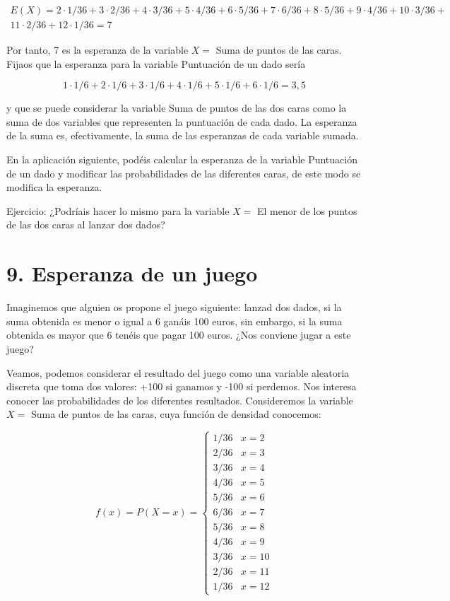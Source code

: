 \documentclass[
  a4paper,
  DIV=11,
  numbers=noendperiod]{scrreprt}
\begin{document}
\[
\begin{gathered}
E(X)=2 \cdot 1 / 36+3 \cdot 2 / 36+4 \cdot 3 / 36+5 \cdot 4 / 36+6 \cdot 5 / 36+7 \cdot 6 / 36+8 \cdot 5 / 36+9 \cdot 4 / 36+10 \cdot 3 / 36+ \\
11 \cdot 2 / 36+12 \cdot 1 / 36=7
\end{gathered}
\]

Por tanto, 7 es la esperanza de la variable \(X=\) Suma de puntos de las
caras. Fijaos que la esperanza para la variable Puntuación de un dado
sería

\[
1 \cdot 1 / 6+2 \cdot 1 / 6+3 \cdot 1 / 6+4 \cdot 1 / 6+5 \cdot 1 / 6+6 \cdot 1 / 6=3,5
\]

y que se puede considerar la variable Suma de puntos de las dos caras
como la suma de dos variables que representen la puntuación de cada
dado. La esperanza de la suma es, efectivamente, la suma de las
esperanzas de cada variable sumada.

En la aplicación siguiente, podéis calcular la esperanza de la variable
Puntuación de un dado y modificar las probabilidades de las diferentes
caras, de este modo se modifica la esperanza.

Ejercicio: ¿Podríais hacer lo mismo para la variable \(X=\) El menor de
los puntos de las dos caras al lanzar dos dados?

\section{9. Esperanza de un juego}\label{esperanza-de-un-juego}

Imaginemos que alguien os propone el juego siguiente: lanzad dos dados,
si la suma obtenida es menor o igual a 6 ganáis 100 euros, sin embargo,
si la suma obtenida es mayor que 6 tenéis que pagar 100 euros. ¿Nos
conviene jugar a este juego?

Veamos, podemos considerar el resultado del juego como una variable
aleatoria discreta que toma dos valores: +100 si ganamos y -100 si
perdemos. Nos interesa conocer las probabilidades de los diferentes
resultados. Consideremos la variable \(X=\) Suma de puntos de las caras,
cuya función de densidad conocemos:

\[
f(x)=P(X=x)= \begin{cases}1 / 36 & x=2 \\ 2 / 36 & x=3 \\ 3 / 36 & x=4 \\ 4 / 36 & x=5 \\ 5 / 36 & x=6 \\ 6 / 36 & x=7 \\ 5 / 36 & x=8 \\ 4 / 36 & x=9 \\ 3 / 36 & x=10 \\ 2 / 36 & x=11 \\ 1 / 36 & x=12\end{cases}
\]
\end{document}
